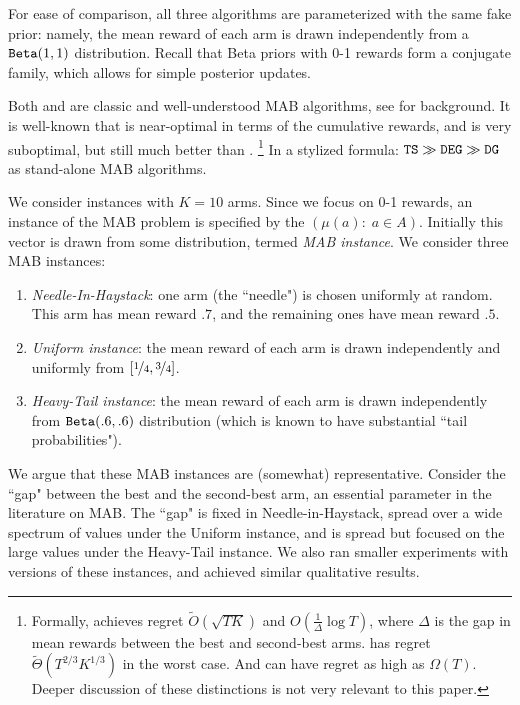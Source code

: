 \documentclass[../competing_bandits.tex]{subfiles}
\begin{document}
For ease of comparison, all three algorithms are parameterized with the same fake prior: namely, the mean reward of each arm is drawn independently from a $\mathtt{Beta}(1,1)$ distribution. Recall that Beta priors with 0-1 rewards form a conjugate family, which allows for simple posterior updates.

Both \DEG and \TS are classic and well-understood MAB algorithms, see \cite{Bubeck-survey12,TS-survey-FTML18} for background. It is well-known that \TS is near-optimal in terms of the cumulative rewards, and \DEG is very suboptimal, but still much better than \DG.%
\footnote{Formally, \TS achieves regret
    $\tilde{O}(\sqrt{TK})$ and
    $O(\tfrac{1}{\Delta} \log T)$,
where $\Delta$ is the gap in mean rewards between the best and second-best arms. \DEG has regret $\tilde{\Theta}(T^{2/3} K^{1/3})$ in the worst case. And \DG can have regret as high as $\Omega(T)$. Deeper discussion of these distinctions is not very relevant to this paper.}
In a stylized formula:
    $ \mathtt{TS} \gg \mathtt{DEG} \gg \mathtt{DG} $
as stand-alone MAB algorithms.

We consider instances with $K=10$ arms. Since we focus on 0-1 rewards, an instance of the MAB problem is specified by the \emph{\MRV} $(\mu(a):\; a\in A)$. Initially this vector is drawn from some distribution, termed \emph{MAB instance}. We consider three MAB instances:
\begin{enumerate}
\item \emph{Needle-In-Haystack}: one arm (the ``needle") is chosen uniformly at random. This arm has mean reward $.7$, and the remaining ones have mean reward $.5$.

\item \emph{Uniform instance}: the mean reward of each arm is drawn independently and uniformly from $[\nicefrac{1}{4}, \nicefrac{3}{4}]$.
\item \emph{Heavy-Tail instance}: the mean reward of each arm is drawn independently from $\mathtt{Beta}(.6,.6)$ distribution (which is known to have substantial ``tail probabilities").
\end{enumerate}
We argue that these MAB instances are (somewhat) representative. Consider the ``gap" between the best and the second-best arm, an essential parameter in the literature on MAB. The ``gap" is fixed in Needle-in-Haystack, spread over a wide spectrum of values under the Uniform instance, and is spread but  focused on the large values under the Heavy-Tail instance. We also ran smaller experiments with versions of these instances, and achieved similar qualitative results.
\end{document}
